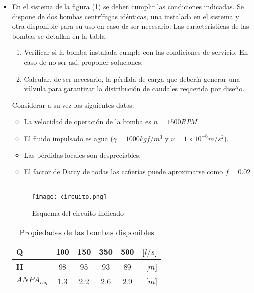 \begin{itemize}
 \item En el sistema de la figura (\ref{fig:circuito}) se deben cumplir las condiciones indicadas. Se dispone de dos bombas centrífugas idénticas, una instalada en el sistema y otra disponible para su uso en caso de ser necesario. Las características de las bombas  se detallan en la tabla.
 \begin{enumerate}
  \item Verificar si la bomba instalada cumple con las condiciones de servicio. En caso de no ser así, proponer soluciones.
  \item Calcular, de ser necesario, la pérdida de carga que debería generar una válvula para garantizar la distribución de caudales requerida por diseño.
 \end{enumerate}
 Considerar a su vez los siguientes datos:
 \begin{itemize}
  \item La velocidad de operación de la bomba es $n=1500RPM$.
  \item El fluido impulsado es agua ($\gamma = 1000 kgf/m^3$ y $\nu = 1 \times 10^{-6}m/s^2$).
  \item Las pérdidas locales son despreciables.
  \item El factor de Darcy de todas las cañerías puede aproximarse como $f=0.02$.
  \end{itemize}
  \vspace{-1cm}
\begin{figure}[!!!ht]
  \centering
   \texttt{[image: circuito.png]}
  \caption{Esquema del circuito indicado}
  \label{fig:circuito}
  \end{figure}

  \begin{table}[!h]
  \centering
  \begin{tabular}{|l|c|c|c|c|r|}
    \hline 
    {\bf Q} & 100 & 150 & 350 & 500 & [$l/s$] \\ 
    \hline 
    {\bf H} & 98 & 95 & 93 & 89 & [$m$] \\ 
    \hline 
    $ANPA_{req}$ & 1.3 & 2.2 & 2.6 & 2.9 & [$m$] \\ 
    \hline 
  \end{tabular}  
  \caption{Propiedades de las bombas disponibles}
  \label{tab:bomba}
  \end{table}

\end{itemize}